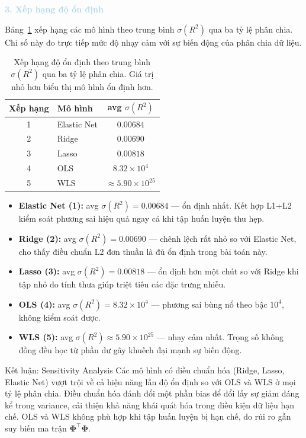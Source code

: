 \vspace{0.5em}
\noindent\textcolor{lightblue}{\textbf{3. Xếp hạng độ ổn định}}
\vspace{0.5em}

Bảng~\ref{tab:sensitivity_stability} xếp hạng các mô hình theo trung bình $\sigma(R^2)$ qua ba tỷ lệ phân chia.
Chỉ số này đo trực tiếp mức độ nhạy cảm với sự biến động của phân chia dữ liệu.

\begin{table}[h]
\centering
\caption{Xếp hạng độ ổn định theo trung bình $\sigma(R^2)$ qua ba tỷ lệ phân chia.
Giá trị nhỏ hơn biểu thị mô hình ổn định hơn.}
\label{tab:sensitivity_stability}
\begin{tabular}{clc}
\toprule
\textbf{Xếp hạng} & \textbf{Mô hình} & \textbf{avg $\sigma(R^2)$} \\
\midrule
1 & Elastic Net & $0.00684$ \\
2 & Ridge       & $0.00690$ \\
3 & Lasso       & $0.00818$ \\
4 & OLS         & $8.32\times10^4$ \\
5 & WLS         & $\approx5.90\times10^{25}$ \\
\bottomrule
\end{tabular}
\end{table}

\begin{itemize}
    \item \textbf{Elastic Net (1):} avg $\sigma(R^2) = 0.00684$ --- ổn định nhất. Kết hợp L1+L2 kiểm soát phương sai hiệu quả ngay cả khi tập huấn luyện thu hẹp.
    \item \textbf{Ridge (2):} avg $\sigma(R^2) = 0.00690$ --- chênh lệch rất nhỏ so với Elastic Net, cho thấy điều chuẩn L2 đơn thuần là đủ ổn định trong bài toán này.
    \item \textbf{Lasso (3):} avg $\sigma(R^2) = 0.00818$ --- ổn định hơn một chút so với Ridge khi tập nhỏ do tính thưa giúp triệt tiêu các đặc trưng nhiễu.
    \item \textbf{OLS (4):} avg $\sigma(R^2) = 8.32\times10^4$ --- phương sai bùng nổ theo bậc $10^4$, không kiểm soát được.
    \item \textbf{WLS (5):} avg $\sigma(R^2) \approx 5.90\times10^{25}$ --- nhạy cảm nhất. Trọng số không đồng đều học từ phần dư gây khuếch đại mạnh sự biến động.
\end{itemize}

\begin{importantbox}{Kết luận: Sensitivity Analysis}
Các mô hình có điều chuẩn hóa (Ridge, Lasso, Elastic Net) vượt trội về cả hiệu năng lẫn
độ ổn định so với OLS và WLS ở mọi tỷ lệ phân chia.
Điều chuẩn hóa đánh đổi một phần bias để đổi lấy sự giảm đáng kể trong variance,
cải thiện khả năng khái quát hóa trong điều kiện dữ liệu hạn chế.
OLS và WLS không phù hợp khi tập huấn luyện bị hạn chế, do rủi ro gần suy biến ma trận $\boldsymbol{\Phi}^\top\boldsymbol{\Phi}$.
\end{importantbox}

